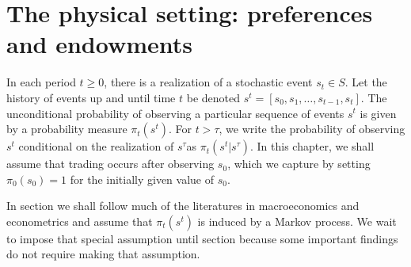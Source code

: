 \section{The physical setting: preferences and endowments}
In each period $t\geq 0$, there is a realization of a stochastic
event $s_t \in S$. Let the history of events up and until time $t$
be denoted $s^t = [s_0, s_{1}, \ldots, s_{t-1}, s_t]$. The unconditional
probability of observing a particular sequence of events $s^t$ is
given by a probability measure $\pi_t(s^t)$. For $t > \tau$, we write the probability
of observing $s^t$ conditional on the realization of $s^\tau$as $\pi_t(s^t\vert s^\tau)$.
In this chapter, we shall assume that trading occurs after
observing $s_0$,
which we capture by setting $\pi_0(s_0)=1$ for the initially
given value of $s_0$.

 In section  we shall follow much of the
 literatures in macroeconomics and econometrics and assume that
 $\pi_t(s^t)$ is induced by  a Markov process. We wait to impose
 that special assumption until section  because some important findings do not
 require making that assumption.




